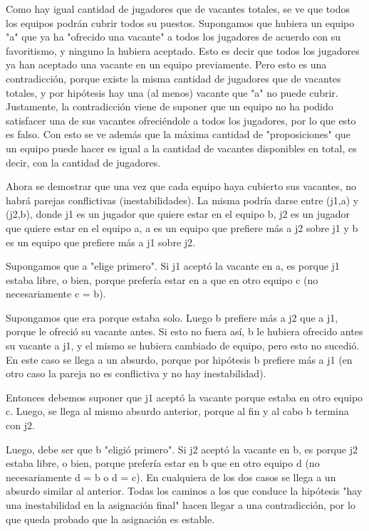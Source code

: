 \documentclass[article,a4paper]{article}
\begin{document}
Como hay igual cantidad de jugadores que de vacantes totales, se ve que todos los equipos podrán cubrir todos su puestos. Supongamos que hubiera un equipo "a" que ya ha "ofrecido una vacante" a todos los jugadores de acuerdo con su favoritismo, y ninguno la hubiera aceptado. Esto es decir que todos los jugadores ya han aceptado una vacante en un equipo previamente. Pero esto es una contradicción, porque existe la misma cantidad de jugadores que de vacantes totales, y por hipótesis hay una (al menos) vacante que "a" no puede cubrir. Justamente, la contradicción viene de suponer que un equipo no ha podido satisfacer una de sus vacantes ofreciéndole a todos los jugadores, por lo que esto es falso. Con esto se ve además que la máxima cantidad de "proposiciones" que un equipo puede hacer es igual a la cantidad de vacantes disponibles en total, es decir, con la cantidad de jugadores.

Ahora se demostrar que una vez que cada equipo haya cubierto sus vacantes, no habrá parejas conflictivas (inestabilidades). La misma podría darse entre (j1,a) y (j2,b), donde j1 es un jugador que quiere estar en el equipo b, j2 es un jugador que quiere estar en el equipo a, a es un equipo que prefiere más a j2 sobre j1 y b es un equipo que prefiere más a j1 sobre j2.

Supongamos que a "elige primero". Si j1 aceptó la vacante en a, es porque j1 estaba libre, o bien, porque prefería estar en a que en otro equipo c (no necesariamente c = b).     

Supongamos que era porque estaba solo. Luego b prefiere más a j2 que a j1, porque le ofreció su vacante antes. Si esto no fuera así, b le hubiera ofrecido antes su vacante a j1, y el mismo se hubiera cambiado de equipo, pero esto no sucedió. En este caso se llega a un absurdo, porque por hipótesis b prefiere más a j1 (en otro caso la pareja no es conflictiva y no hay inestabilidad).

Entonces debemos suponer que j1 aceptó la vacante porque estaba en otro equipo c. Luego, se llega al mismo absurdo anterior, porque al fin y al cabo b termina con j2.

Luego, debe ser que b "eligió primero". Si j2 aceptó la vacante en b, es porque j2 estaba libre, o bien, porque prefería estar en b que en otro equipo d (no necesariamente d = b o d = c). En cualquiera de los dos casos se llega a un absurdo similar al anterior.
Todas los caminos a los que conduce la hipótesis "hay una inestabilidad en la asignación final" hacen llegar a una contradicción, por lo que queda probado que la asignación es estable.
\end{document}

